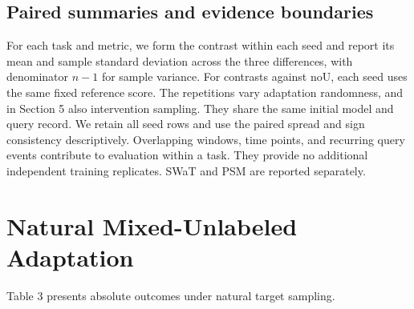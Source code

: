 \documentclass[pdflatex,sn-apa]{sn-jnl}
\begin{document}
\subsection{Paired summaries and evidence
boundaries}\label{paired-summaries-and-evidence-boundaries}

For each task and metric, we form the contrast within each seed and
report its mean and sample standard deviation across the three
differences, with denominator \(n-1\) for sample variance. For contrasts
against noU, each seed uses the same fixed reference score. The
repetitions vary adaptation randomness, and in Section 5 also
intervention sampling. They share the same initial model and query
record. We retain all seed rows and use the paired spread and sign
consistency descriptively. Overlapping windows, time points, and
recurring query events contribute to evaluation within a task. They
provide no additional independent training replicates. SWaT and PSM are
reported separately.

\section{Natural Mixed-Unlabeled
Adaptation}\label{natural-mixed-unlabeled-adaptation}

Table 3 presents absolute outcomes under natural target sampling.
\end{document}

